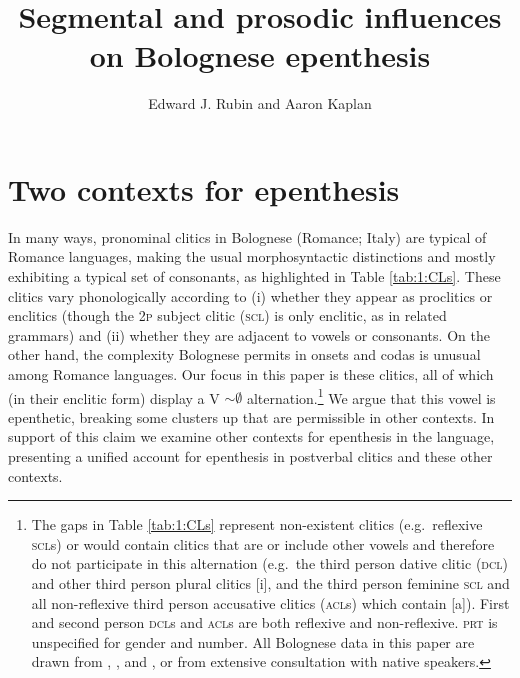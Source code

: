 \documentclass[output=paper,colorlinks,citecolor=brown]{langscibook}
\author{Edward J. Rubin\affiliation{University of Utah} and Aaron Kaplan\affiliation{University of Utah}}
\title{Segmental and prosodic influences on Bolognese epenthesis}
\begin{document}
\maketitle \label{ch5}

\section{Two contexts for epenthesis}
In many ways, pronominal clitics in Bolognese (Romance; Italy) are typical of Romance languages, making the usual morphosyntactic distinctions and mostly exhibiting a typical set of consonants, as highlighted in Table \ref{tab:1:CLs}. These clitics vary phonologically according to (i) whether they appear as proclitics or enclitics (though the 2\textsc{p} subject clitic (\textsc{scl}) is only enclitic, as in related grammars) and (ii) whether they are adjacent to vowels or consonants. On the other hand, the complexity Bolognese permits in onsets and codas is unusual among Romance languages. Our focus in this paper is these clitics, all of which (in their enclitic form) display a V $\sim\emptyset$ alternation.\footnote{The gaps in Table \ref{tab:1:CLs} represent non-existent clitics (e.g.\ reflexive \textsc{scl}s) or would contain clitics that are or include other vowels and therefore do not participate in this alternation (e.g.\ the third person dative clitic (\textsc{dcl}) and other third person plural clitics [i], and the third person feminine \textsc{scl} and all non-reflexive third person accusative clitics (\textsc{acl}s) which contain [a]). First and second person \textsc{dcl}s and \textsc{acl}s are both reflexive and non-reflexive. \textsc{prt} is unspecified for gender and number. All Bolognese data in this paper are drawn from \citet{caneparivitali:bolognese}, \citet{bologneseprimertwo}, and \citet{leprivitali:dict}, or from extensive consultation with native speakers.}  We argue that this vowel is epenthetic, breaking some clusters up that are permissible in other contexts. In support of this claim we examine other contexts for epenthesis in the language, presenting a unified account for epenthesis in postverbal clitics and these other contexts.
\end{document}
